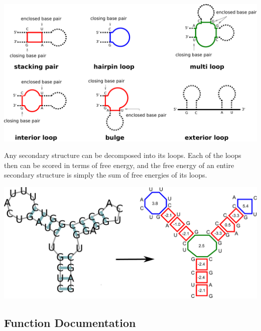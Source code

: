  
\begin{DoxyImageNoCaption}
  \mbox{\includegraphics[width=\textwidth,height=\textheight/2,keepaspectratio=true]{loop_types}}
\end{DoxyImageNoCaption}


Any secondary structure can be decomposed into its loops. Each of the loops then can be scored in terms of free energy, and the free energy of an entire secondary structure is simply the sum of free energies of its loops.

 
\begin{DoxyImageNoCaption}
  \mbox{\includegraphics[width=\textwidth,height=\textheight/2,keepaspectratio=true]{loop_decomposition}}
\end{DoxyImageNoCaption}
 

\subsection{Function Documentation}
\mbox{\label{group__eval_ga58f199f1438d794a265f3b27fc8ea631}} 
